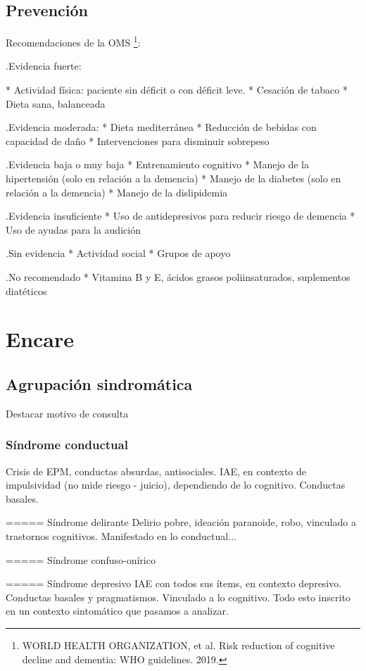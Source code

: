 \subsection*{Prevención}
Recomendaciones de la OMS \footnote{WORLD HEALTH ORGANIZATION, et al. Risk reduction of cognitive decline and dementia: WHO guidelines. 2019.}:

.Evidencia fuerte:

* Actividad física: paciente sin déficit o con déficit leve.
* Cesación de tabaco
* Dieta sana, balanceada

.Evidencia moderada:
* Dieta mediterránea
* Reducción de bebidas con capacidad de daño
* Intervenciones para disminuir sobrepeso

.Evidencia baja o muy baja
* Entrenamiento cognitivo
* Manejo de la hipertensión (solo en relación a la demencia)
* Manejo de la diabetes (solo en relación a la demencia)
* Manejo de la dislipidemia

.Evidencia insuficiente
* Uso de antidepresivos para reducir riesgo de demencia
* Uso de ayudas para la audición

.Sin evidencia
* Actividad social
* Grupos de apoyo

.No recomendado
* Vitamina B y E, ácidos grasos poliinsaturados, suplementos diatéticos

\section*{Encare}
\subsection*{Agrupación sindromática}
Destacar motivo de consulta
\subsubsection*{Síndrome conductual}
Crisis de EPM, conductas absurdas, antisociales. IAE, en contexto de impulsividad (no mide riesgo - juicio), dependiendo de lo cognitivo. Conductas basales.

=====  Síndrome delirante
Delirio pobre, ideación paranoide, robo, vinculado a trastornos cognitivos. Manifestado en lo conductual...

===== Síndrome confuso-onírico

===== Síndrome depresivo
IAE con todos sus ítems, en contexto depresivo. Conductas basales y pragmatismos. Vinculado a lo cognitivo. Todo esto inscrito en un contexto sintomático que pasamos a analizar.

